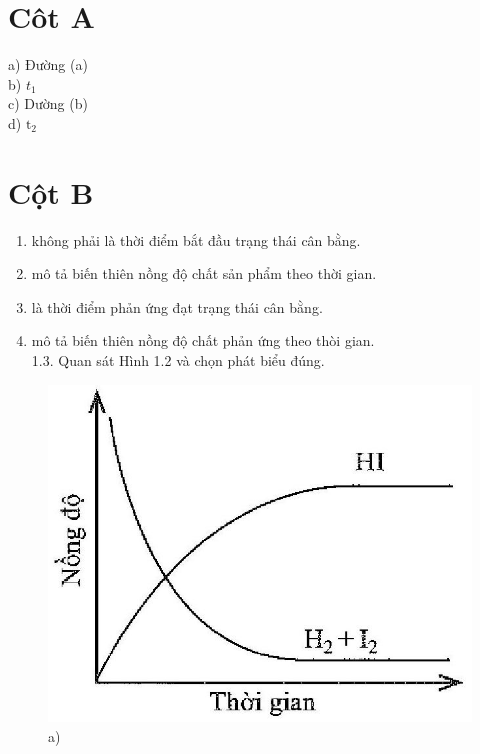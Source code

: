 \documentclass[10pt]{article}
\begin{document}
\section*{Côt A}
a) Đường (a)\\
b) $t_{1}$\\
c) Dường (b)\\
d) $\mathrm{t}_{2}$

\section*{Cột B}
\begin{enumerate}
  \item không phải là thời điểm bắt đầu trạng thái cân bằng.
  \item mô tả biến thiên nồng độ chất sản phẩm theo thời gian.
  \item là thời điểm phản ứng đạt trạng thái cân bằng.
  \item mô tả biến thiên nồng độ chất phản ứng theo thòi gian.\\
1.3. Quan sát Hình 1.2 và chọn phát biểu đúng.
\end{enumerate}

\begin{figure}[h]
\begin{center}
  \includegraphics[width=\textwidth]{2025_10_23_f2823ef970776205e47bg-02(1)}
\captionsetup{labelformat=empty}
\caption{a)}
\end{center}
\end{figure}
\end{document}
